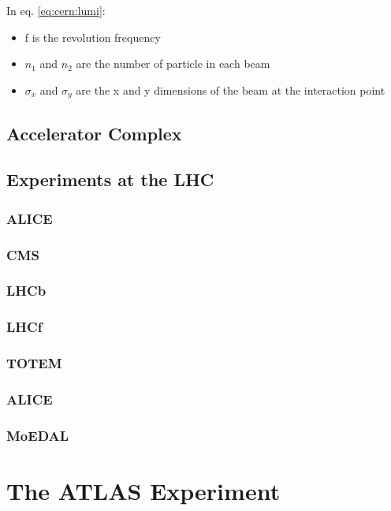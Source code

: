 In eq. \ref{eq:cern:lumi}:
\begin{itemize}
\item f is the revolution frequency
\item $n_1$ and $n_2$ are the number of particle in each beam
\item $\sigma_x$ and $\sigma_y$ are the x and y dimensions of the beam at the interaction point
\end{itemize}

\subsection{Accelerator Complex}

\subsection{Experiments at the LHC}

\subsubsection*{ALICE}

\subsubsection*{CMS}

\subsubsection*{LHCb}

\subsubsection*{LHCf}

\subsubsection*{TOTEM}

\subsubsection*{ALICE}

\subsubsection*{MoEDAL}



\section{The ATLAS Experiment}
\label{sed:cern:atlas}


